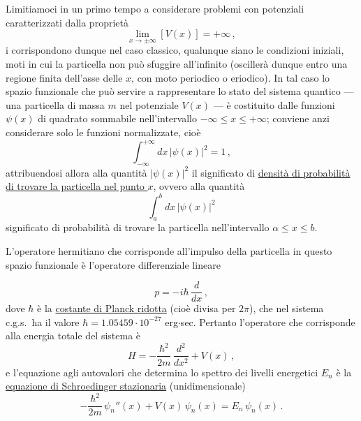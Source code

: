 \documentclass[11pt, a4paper]{book}
\numberwithin{equation}{section}
\begin{document}
Limitiamoci in un primo tempo a considerare problemi con potenziali caratterizzati dalla proprietà
\begin{equation}
\lim_{x \to \pm\infty} \left[V(x)\right] = +\infty \,, \tag{2}
\end{equation}
i corrispondono dunque nel caso classico, qualunque siano le condizioni
iniziali, moti in cui la particella non può sfuggire all'infinito (oscillerà
dunque entro una regione finita dell'asse delle $x$, con moto periodico o
eriodico). In tal caso lo spazio funzionale che può servire a rappresentare lo stato del sistema quantico --- una particella di massa $m$ nel potenziale $V(x)$ --- è costituito dalle funzioni $\psi(x)$ di quadrato sommabile nell'intervallo $-\infty \leq x \leq +\infty$; conviene anzi considerare solo le funzioni normalizzate, cioè
\begin{equation}
\int_{-\infty}^{+\infty} dx\, |\psi(x)|^2 = 1 \,, \tag{3}
\end{equation}
attribuendosi allora alla quantità $|\psi(x)|^2$ il significato di \underline{densità
di probabilità di trovare la particella nel punto $x$}, ovvero alla quantità
\[
\int_a^b dx\, |\psi(x)|^2
\]
significato di probabilità di trovare la particella nell'intervallo $\alpha \leq x \leq b$.

L'operatore hermitiano che corrisponde all'impulso della particella in
questo spazio funzionale è l'operatore differenziale lineare


\begin{equation}
p = -i\hbar\, \frac{d}{dx} \,, \tag{4}
\end{equation}
dove $\hbar$ è la \underline{costante di Planck ridotta} (cioè divisa per $2\pi$), che nel
sistema c.g.s.\ ha il valore $\hbar = 1.05459 \cdot 10^{-27}$ erg$\cdot$sec. Pertanto l'operatore che corrisponde alla energia totale del sistema è
\begin{equation}
H = -\frac{\hbar^2}{2m}\, \frac{d^2}{dx^2} + V(x) \,, \tag{5}
\end{equation}
e l'equazione agli autovalori che determina lo spettro dei livelli energetici
$E_n$ è la \underline{equazione di Schroedinger stazionaria} (unidimensionale)
\begin{equation}
-\frac{\hbar^2}{2m}\, \psi_n''(x) + V(x)\, \psi_n(x) = E_n\, \psi_n(x) \,. \tag{6}
\end{equation}
\end{document}
